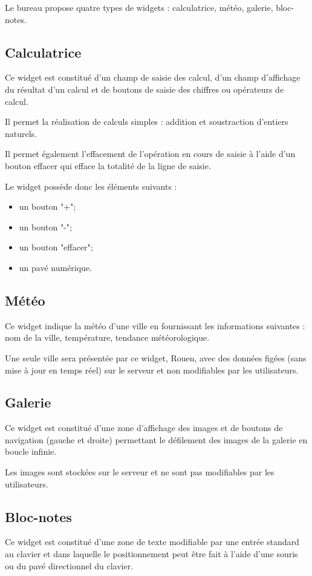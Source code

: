 Le bureau propose quatre types de widgets : calculatrice, météo, galerie, bloc-notes.
{\color{red}
\subsection*{Calculatrice}

Ce widget est constitué d'un champ de saisie des calcul, d'un champ d'affichage du résultat d'un calcul et de boutons de saisie des chiffres ou opérateurs de calcul.

Il permet la réalisation de calculs simples : addition et soustraction d'entiers naturels.

Il permet également l'effacement de l'opération en cours de saisie à l'aide d'un bouton effacer qui efface la totalité de la ligne de saisie.

Le widget possède donc les éléments suivants :
\begin{itemize}
\item un bouton "+";
\item un bouton "-";
\item un bouton "effacer";
\item un pavé numérique.
\end{itemize}
}
\subsection*{Météo}
Ce widget indique la météo d'une ville en fournissant les informations suivantes : nom de la ville, température, tendance météorologique.

Une seule ville sera présentée par ce widget, Rouen, avec des données figées (sans mise à jour en temps réel) sur le serveur et non modifiables par les utilisateurs.

\subsection*{Galerie}
Ce widget est constitué d'une zone d'affichage des images et de boutons de navigation (gauche et droite) permettant le défilement des images de la galerie en boucle infinie.

Les images sont stockées sur le serveur et ne sont pas modifiables par les utilisateurs.

\subsection*{Bloc-notes}
Ce widget est constitué d'une zone de texte modifiable par une entrée standard au clavier et dans laquelle le positionnement peut être fait à l'aide d'une souris ou du pavé directionnel du clavier.